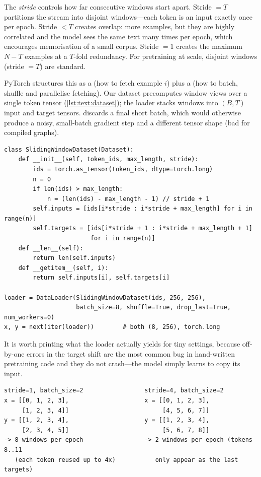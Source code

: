 The \emph{stride} controls how far consecutive windows start apart. Stride $=T$ partitions the
stream into disjoint windows---each token is an input exactly once per epoch. Stride $<T$ creates
overlap: more examples, but they are highly correlated and the model sees the same text many times
per epoch, which encourages memorisation of a small corpus. Stride $=1$ creates the maximum $N-T$
examples at a $T$-fold redundancy. For pretraining at scale, disjoint windows (stride $=T$) are
standard.

PyTorch structures this as a  (how to fetch example $i$) plus a 
(how to batch, shuffle and parallelise fetching). Our dataset precomputes window views over a
single token tensor (\cref{lst:text:dataset}); the loader stacks  windows into
$(B,T)$ input and target tensors.  discards a final short batch, which would
otherwise produce a noisy, small-batch gradient step and a different tensor shape (bad for
compiled graphs).

\begin{lstlisting}[caption={A sliding-window dataset and loader (core: \texttt{llmsys/data.py}).},label={lst:text:dataset}]
class SlidingWindowDataset(Dataset):
    def __init__(self, token_ids, max_length, stride):
        ids = torch.as_tensor(token_ids, dtype=torch.long)
        n = 0
        if len(ids) > max_length:
            n = (len(ids) - max_length - 1) // stride + 1
        self.inputs = [ids[i*stride : i*stride + max_length] for i in range(n)]
        self.targets = [ids[i*stride + 1 : i*stride + max_length + 1]
                        for i in range(n)]
    def __len__(self):
        return len(self.inputs)
    def __getitem__(self, i):
        return self.inputs[i], self.targets[i]

loader = DataLoader(SlidingWindowDataset(ids, 256, 256),
                    batch_size=8, shuffle=True, drop_last=True, num_workers=0)
x, y = next(iter(loader))        # both (8, 256), torch.long
\end{lstlisting}

It is worth printing what the loader actually yields for tiny settings, because off-by-one errors
in the target shift are the most common bug in hand-written pretraining code and they do not
crash---the model simply learns to copy its input.

\begin{lstlisting}[style=plain,caption={Loader output for a toy stream \texttt{0..11} with $T=4$: stride 1 vs.\ stride 4.},label={lst:text:strides}]
stride=1, batch_size=2                 stride=4, batch_size=2
x = [[0, 1, 2, 3],                     x = [[0, 1, 2, 3],
     [1, 2, 3, 4]]                          [4, 5, 6, 7]]
y = [[1, 2, 3, 4],                     y = [[1, 2, 3, 4],
     [2, 3, 4, 5]]                          [5, 6, 7, 8]]
-> 8 windows per epoch                 -> 2 windows per epoch (tokens 8..11
   (each token reused up to 4x)           only appear as the last targets)
\end{lstlisting}

